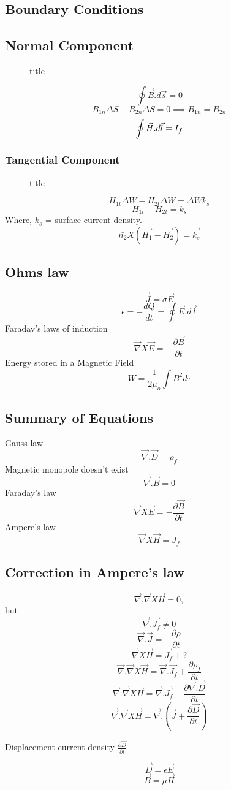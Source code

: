 \subsection*{Boundary Conditions}
\subsection*{Normal Component}
\begin{figure}[H]
    \centering
    \caption{title}
    \label{fig:normcom}
\end{figure}
\[
    \oint \vec{B}. d\vec{s} = 0 
\]
\[
    B_{1n} \Delta S - B_{2n} \Delta S = 0 \implies B_{1n} = B_{2n} 
\]
\[
    \oint \vec{H}.d\vec{l} = I_{f} \vspace{0.3pt}
\]
\subsubsection*{Tangential Component}
\begin{figure}[H]
    \centering
    \caption{title}
    \label{fig:magtan}
\end{figure}
\[
    H_{1t}\Delta W - H_{2t} \Delta W = \Delta W k_s 
\]
\[
    H_{1t} - H_{2t}=k_s 
\]Where, \(k_{s} \) = surface current density. 
\[
    \bar{n_2} X (\vec{H_1} -\vec{H_2}) = \vec{k_s}
\] 
\subsection*{Ohms law}
\[
    \vec{J} = \sigma \vec{E}
\]
\[
    \epsilon = -\frac{dQ}{dt} = \oint \vec{E}.d\vec{l}
\]
Faraday's laws of induction
\[
    \vec{\nabla}X\vec{E} = -\frac{\partial \vec{B}}{\partial t}
\]
Energy stored in a Magnetic Field
\[
    W = \frac{1}{2 \mu_{o}} \int B^2 d\tau 
\]
\subsection*{Summary of Equations}
Gauss law
\[
    \vec{\nabla}. \vec{D} = \rho_{f} 
\]
Magnetic monopole doesn't exist
\[
    \vec{\nabla}.\vec{B} = 0
\]
Faraday's law
\[
    \vec{\nabla}X\vec{E} = - \frac{\partial \vec{B}}{\partial t}
\]
Ampere's law
\[
    \vec{\nabla}X\vec{H} = J_{f} 
\]
\subsection{Correction in Ampere's law}
\[
    \vec{\nabla}.\vec{\nabla}X\vec{H} = 0, 
\]
but 
\[
    \vec{\nabla}.\vec{J_{f} } \neq 0
\]
\[
    \vec{\nabla}.\vec{J} = -\frac{\partial \rho}{\partial t}
\]
\[
    \vec{\nabla}X\vec{H} = \vec{J_{f} }+ ?
\]
\[
    \vec{\nabla}.\vec{\nabla}X\vec{H} = \vec{\nabla}.\vec{J_{f} }+ \frac{\partial \rho_{f} }{\partial t}
\]
\[
    \vec{\nabla}.\vec{\nabla}X\vec{H} = \vec{\nabla}.\vec{J_{f} }+\frac{\partial \vec{\nabla}.\vec{D}}{\partial t}
\]
\[
    \vec{\nabla}.\vec{\nabla}X\vec{H} = \vec{\nabla}.\left(\vec{J}+\frac{\partial \vec{D}}{\partial t}\right)
\]
\begin{definition}
    Displacement current density \(\frac{\partial \vec{D}}{\partial t}\) 
\end{definition}
\[
    \vec{D} = \epsilon \vec{E}
\]
\[
    \vec{B} = \mu \vec{H}
\]

